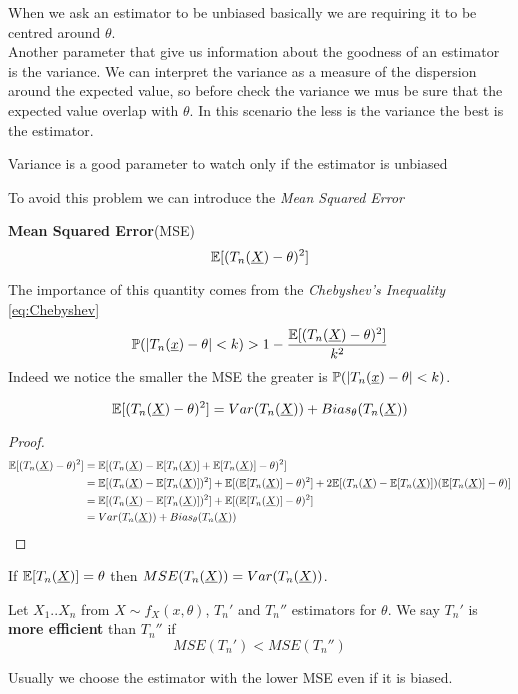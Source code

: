 When we ask an estimator to be unbiased basically we are requiring it to be centred around $\theta$.\\
Another parameter that give us information about the goodness of an estimator is the variance. We can interpret the variance as a measure of the dispersion around the expected value, so before check the variance we mus be sure that the expected value overlap with $\theta$. In this scenario the less is the variance the best is the estimator.
\begin{oss}
	Variance is a good parameter to watch only if the estimator is unbiased
\end{oss}
To avoid this problem we can introduce the \textit{Mean Squared Error}
\begin{defi}\textbf{Mean Squared Error}(MSE)
	\[
	\mathbb{E}[(T_n(\underline X)-\theta)^2]
	\]
\end{defi}
The importance of this quantity comes from the \textit{Chebyshev's Inequality} \ref{eq:Chebyshev}
\[
\mathbb{P}(|T_n(\underline x)-\theta|< k)>1-\frac{\mathbb{E}[(T_n(\underline X)-\theta)^2]}{k^2}
\]
Indeed we notice the smaller the MSE the greater is $\mathbb{P}(|T_n(\underline x)-\theta|< k)$.
\begin{prop}
	$$\mathbb{E}[(T_n(\underline X)-\theta)^2]=Var(T_n(\underline X))+Bias_\theta(T_n(\underline X))$$
\end{prop}
\begin{proof}
	\[
	\begin{split}
		\mathbb{E}[(T_n(\underline X)-\theta)^2]
		&=\mathbb{E}[(T_n(\underline X) - \mathbb{E}[T_n(\underline X)] + \mathbb{E}[T_n(\underline X)]-\theta)^2 ]\\
		&=\mathbb{E}[(T_n(\underline X)-\mathbb{E}[T_n(\underline X)])^2]+\mathbb{E}[(\mathbb{E}[T_n(\underline X)]-\theta)^2]+2\mathbb{E}[(T_n(\underline X)-\mathbb{E}[T_n(\underline X)])(\mathbb{E}[T_n(\underline X)]-\theta)]\\
		&=\mathbb{E}[(T_n(\underline X)-\mathbb{E}[T_n(\underline X)])^2]+\mathbb{E}[(\mathbb{E}[T_n(\underline X)]-\theta)^2]\\
		&=Var(T_n(\underline X))+Bias_\theta(T_n(\underline X))
	\end{split}
	\]
\end{proof}
\begin{oss}
	If $\mathbb{E}[T_n(\underline X)]=\theta$ then $MSE(T_n(\underline X))=Var(T_n(\underline X))$.
\end{oss}
\begin{defi}
	Let $X_1.. X_n$ from $X\sim f_X(x,\theta)$, $T_n'$ and $T_n''$ estimators for $\theta$. We say $T_n'$ is  \textbf{more efficient} than $T_n''$ if
	$$MSE(T_n')<MSE(T_n'')$$
\end{defi}
Usually we choose the estimator with the lower MSE even if it is biased.\\


